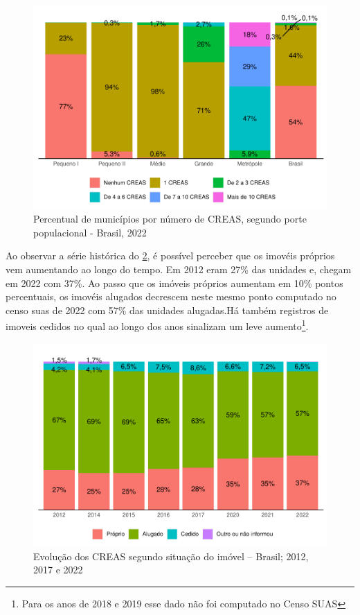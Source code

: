 \documentclass[
  brazilian]{report}
\begin{document}
\begin{figure}
\includegraphics{Censo-SUAS-2022_files/figure-latex/CREAS-porte-1} \caption[Percentual de municípios por número de CREAS, segundo porte populacional - Brasil, 2022]{Percentual de municípios por número de CREAS, segundo porte populacional - Brasil, 2022}\label{fig:CREAS-porte}
\end{figure}

Ao observar a série histórica do \cref{fig:creas-situacao}, é possível
perceber que os imovéis próprios vem aumentando ao longo do tempo. Em
2012 eram 27\% das unidades e, chegam em 2022 com 37\%. Ao passo que os
imóveis próprios aumentam em 10\% pontos percentuais, os imovéis
alugados decrescem neste mesmo ponto computado no censo suas de 2022 com
57\% das unidades alugadas.Há também registros de imoveis cedidos no
qual ao longo dos anos sinalizam um leve
aumento\footnote{Para os anos de 2018 e 2019 esse dado não foi computado no Censo SUAS}.

\begin{figure}
\includegraphics{Censo-SUAS-2022_files/figure-latex/creas-situacao-1} \caption[Evolução dos CREAS segundo situação do imóvel – Brasil]{Evolução dos CREAS segundo situação do imóvel – Brasil; 2012, 2017 e 2022}\label{fig:creas-situacao}
\end{figure}
\end{document}
